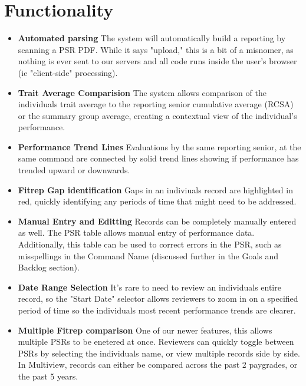 \documentclass[UTF8]{article}
\begin{document}
\section{Functionality}
\begin{itemize}
  \item \textbf{Automated parsing} The system will automatically build a reporting by scanning a PSR PDF. While it says "upload," this is a bit of a misnomer, as nothing is ever sent to our servers and all code runs inside the user's browser (ie "client-side" processing).
  \item \textbf{Trait Average Comparision} The system allows comparison of the individuals trait average to the reporting senior cumulative average (RCSA) or the summary group average, creating a contextual view of the individual's performance.
  \item \textbf{Performance Trend Lines} Evaluations by the same reporting senior, at the same command are connected by solid trend lines showing if performance has trended upward or downwards.
  \item \textbf{Fitrep Gap identification} Gaps in an indiviuals record are highlighted in red, quickly identifying any periods of time that might need to be addressed.
  \item \textbf{Manual Entry and Editting} Records can be completely manually entered as well. The PSR table allows manual entry of performance data. Additionally, this table can be used to correct errors in the PSR, such as misspellings in the Command Name (discussed further in the Goals and Backlog section).
  \item \textbf{Date Range Selection} It's rare to need to review an individuals entire record, so the "Start Date" selector allows reviewers to zoom in on a specified period of time so the individuals most recent performance trends are clearer.
  \item \textbf{Multiple Fitrep comparison} One of our newer features, this allows multiple PSRs to be enetered at once. Reviewers can quickly toggle between PSRs by selecting the individuals name, or view multiple records side by side. In Multiview, records can either be compared across the past 2 paygrades, or the past 5 years.
\end{itemize}
\end{document}
